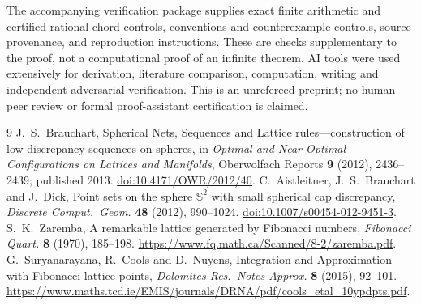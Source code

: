 \documentclass[11pt]{article}
\begin{document}
The accompanying verification package supplies exact finite arithmetic
and certified rational chord controls, conventions and counterexample
controls, source provenance, and reproduction instructions. These are
checks supplementary to the proof, not a computational proof of an
infinite theorem. AI tools were used extensively for derivation,
literature comparison, computation, writing and independent adversarial
verification. This is an unrefereed preprint; no human peer review or
formal proof-assistant certification is claimed.

\begin{thebibliography}{9}
 J.~S.~Brauchart,
Spherical Nets, Sequences and Lattice rules---construction of
low-discrepancy sequences on spheres, in \emph{Optimal and Near Optimal
Configurations on Lattices and Manifolds}, Oberwolfach Reports
\textbf{9} (2012), 2436--2439; published 2013.
\href{https://doi.org/10.4171/OWR/2012/40}{doi:10.4171/OWR/2012/40}.
 C.~Aistleitner, J.~S.~Brauchart and J.~Dick,
Point sets on the sphere $\mathbb S^2$ with small spherical cap
discrepancy, \emph{Discrete Comput.~Geom.} \textbf{48} (2012), 990--1024.
\href{https://doi.org/10.1007/s00454-012-9451-3}{doi:10.1007/s00454-012-9451-3}.
 S.~K.~Zaremba,
A remarkable lattice generated by Fibonacci numbers,
\emph{Fibonacci Quart.} \textbf{8} (1970), 185--198.
\url{https://www.fq.math.ca/Scanned/8-2/zaremba.pdf}.
 G.~Suryanarayana, R.~Cools and D.~Nuyens,
Integration and Approximation with Fibonacci lattice points,
\emph{Dolomites Res.~Notes Approx.} \textbf{8} (2015), 92--101.
\url{https://www.maths.tcd.ie/EMIS/journals/DRNA/pdf/cools_etal_10ypdpts.pdf}.
\end{thebibliography}
\end{document}
